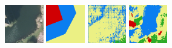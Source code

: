 \begin{figure}
    \newcommand{\DensenetPredictionsImageWidth}{0.15\textwidth}
    \centering

    \includegraphics[width=\DensenetPredictionsImageWidth]{images/densenet/101444-image} \hfill
    \includegraphics[width=\DensenetPredictionsImageWidth]{images/densenet/101444-label} \hfill
    \includegraphics[width=\DensenetPredictionsImageWidth]{images/densenet/densenet-103D/101444-prediction} \hfill
    \includegraphics[width=\DensenetPredictionsImageWidth]{images/densenet/densenet-103CD/101444-prediction} \hfill

\end{figure}
